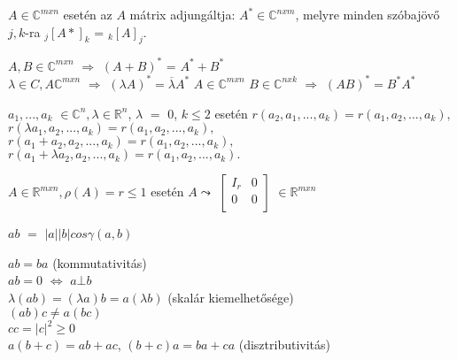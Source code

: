 	\begin{frame}
		\begin{tcolorbox}[title={Def.: Adjugált}]
			 $A  \in \mathbb{C}^{m x n}$ esetén az $A$ mátrix adjungáltja: $A^{{\ast}} \in \mathbb{C}^{n x m}$, melyre minden szóbajövő $j, k$-ra $_{j} [A{\ast}]_k$ = $_{k} [A]_j$.
		\end{tcolorbox}
		
		\begin{tcolorbox}[title={Tétel.: Az adjungálás kapcsolata a mátrixműveletekkel}]
			$A, B \in \mathbb{C}^{m x n}$ $\Rightarrow$ $(A + B)^*$ = $A^* + B^*$\\
			$\lambda \in C, A \mathbb{C}^{m x n}$  $\Rightarrow$ $({\lambda}A)^* = \overline{{\lambda}}A^*$
			$A \in \mathbb{C}^{m x n}$ $B \in \mathbb{C}^{n x k}$ $\Rightarrow$ $(AB)^* = B^*A^*$
		\end{tcolorbox}
		
		\begin{tcolorbox}[title={Tétel: Rangtartó átalakítások}]
			$a_1, ..., a_k$ $\in \mathbb{C}^{n}, {\lambda} \in \mathbb{R}^n$, ${\lambda}$ $=$ $0$, $k \leq 2$ esetén
			$r(a_2, a_1, ..., a_k) = r(a_1, a_2, ..., a_k),$\\
			$r({\lambda}a_1, a_2, ..., a_k) = r(a_1, a_2, ..., a_k),$\\
			$r(a_1 + a_2, a_2, ..., a_k) = r(a_1, a_2, ..., a_k),$\\
			$r(a_1 + {\lambda}a_2, a_2, ..., a_k) = r(a_1, a_2, ..., a_k).$
		\end{tcolorbox}
		
		\begin{tcolorbox}[title={Tétel: Rangtartó átalakítások és mátrixok}]
			$A  \in \mathbb{R}^{m x n}, {\rho}(A) = r \leq 1$ esetén $A \leadsto$ $\begin{bmatrix} 
  				I_r & 0  \\ 
  				0 & 0 \\
			\end{bmatrix}$ $\in \mathbb{R}^{m x n}$
		\end{tcolorbox}	
		
		\begin{tcolorbox}[title={Def.: Geometriai vektorok skaláris szorzata tulajdonságai}]
			$ab$ $=$ $|a| |b| cos {\gamma}(a, b)$\\
		\end{tcolorbox}	
		
		\begin{tcolorbox}[title={Def.: Skaláris szorzat, geometriai vektorokra}]
			$ab = ba$ (kommutativitás)\\
			$ab = 0$ $\iff$ $a \bot b$\\
			${\lambda}(ab) = ({\lambda}a)b = a({\lambda}b)$ (skalár kiemelhetősége)\\
			$(ab)c \neq a(bc)$\\
			$cc = |c|^2 \geq 0$\\
			$a(b + c) = ab + ac$, $(b + c)a = ba + ca$ (disztributivitás)
		\end{tcolorbox}	
	\end{frame}
	
